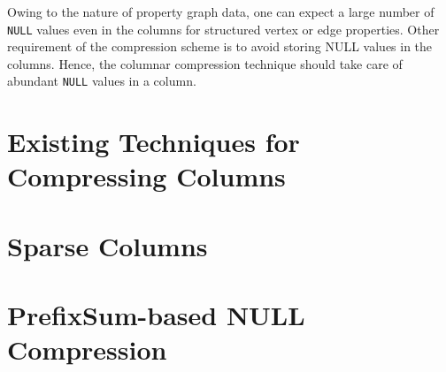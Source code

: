 Owing to the nature of property graph data, one can expect a large number of \texttt{NULL} values even in the columns for structured vertex or edge properties. Other requirement of the compression scheme is to avoid storing NULL values in the columns. Hence, the columnar compression technique should take care of abundant \texttt{NULL} values in a column. 

\section{Existing Techniques for Compressing Columns}
\label{sec:col-existing}

\section{Sparse Columns}
\label{sec:sparse}

\section{PrefixSum-based NULL Compression}
\label{sec:prefixbased}